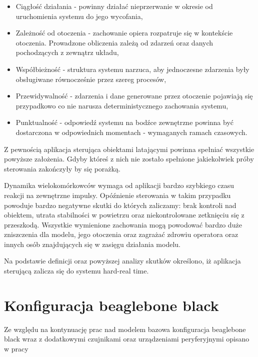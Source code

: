 \begin{itemize}
	\item Ciągłość działania - powinny działać nieprzerwanie w okresie od uruchomienia systemu do jego wycofania,
	
	\item Zależność od otoczenia - zachowanie opiera rozpatruje się w kontekście otoczenia. Prowadzone obliczenia zależą od zdarzeń oraz danych pochodzących z zewnątrz układu,
	
	\item Współbieżność - struktura systemu narzuca, aby jednoczesne zdarzenia były obsługiwane równocześnie przez szereg procesów,
	
	\item Przewidywalność - zdarzenia i dane generowane przez otoczenie pojawiają się przypadkowo co nie narusza deterministycznego zachowania systemu,
	
	\item Punktualność - odpowiedź systemu na bodźce zewnętrzne powinna być dostarczona w odpowiednich momentach - wymaganych ramach czasowych.
\end{itemize}

Z pewnością aplikacja sterująca obiektami latającymi powinna spełniać wszystkie powyższe założenia. Gdyby któreś z nich nie zostało spełnione jakiekolwiek próby sterowania zakończyły by się porażką.

Dynamika wielokomórkowców wymaga od aplikacji bardzo szybkiego czasu reakcji na zewnętrzne impulsy. Opóźnienie sterowania w takim przypadku powoduje bardzo negatywne skutki do których zaliczamy: brak kontroli nad obiektem, utrata stabilności w powietrzu oraz niekontrolowane zetknięciu się z przeszkodą. Wszystkie wymienione zachowania mogą powodować bardzo duże zniszczenia dla modelu, jego otoczenia oraz zagrażać zdrowiu operatora oraz innych osób znajdujących się w zasięgu działania modelu.

Na podstawie definicji oraz powyższej analizy skutków określono, iż aplikacja sterującą zalicza się do systemu hard-real time. 




\section{Konfiguracja beaglebone black}
Ze względu na kontynuację prac nad modelem bazowa konfiguracja beaglebone black wraz z dodatkowymi czujnikami oraz urządzeniami peryferyjnymi opisano w pracy

